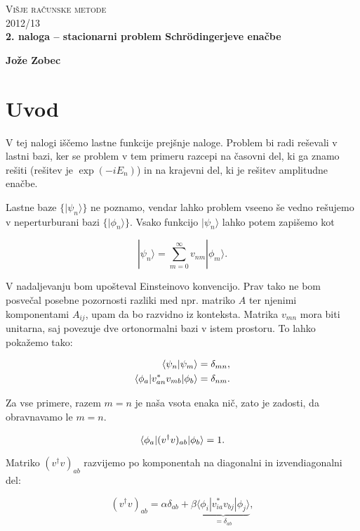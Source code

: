 \documentclass[a4 paper, 12pt]{article}
\begin{document}
\begin{center}
\textsc{Višje računske metode}\\
\textsc{2012/13}\\[0.5cm]
\textbf{2. naloga -- stacionarni problem Schr\" odingerjeve enačbe}
\end{center}
\begin{flushright}
\textbf{Jože Zobec}
\end{flushright}

\section{Uvod}

V tej nalogi iščemo lastne funkcije prejšnje naloge. Problem bi radi reševali v lastni bazi,
ker se problem v tem primeru razcepi na časovni del, ki ga znamo rešiti (rešitev je
$\exp(-iE_n)$) in na krajevni del, ki je rešitev amplitudne enačbe.

Lastne baze $\big\{|\psi_n\rangle\big\}$ ne poznamo, vendar lahko problem vseeno še vedno
rešujemo v neperturburani bazi $\big\{|\phi_n\rangle\big\}$. Vsako funkcijo $|\psi_n\rangle$
lahko potem zapišemo kot

\[
	|\psi_n\rangle = \sum_{m=0}^\infty v_{nm}|\phi_m\rangle.
\]

V nadaljevanju bom upošteval Einsteinovo konvencijo. Prav tako ne bom posvečal posebne
pozornosti razliki med npr. matriko $A$ ter njenimi komponentami $A_{ij}$, upam da bo razvidno
iz konteksta. Matrika $v_{mn}$ mora biti unitarna, saj povezuje dve ortonormalni bazi v istem prostoru.
To lahko pokažemo tako:

\begin{align}
	\langle\psi_n|\psi_m\rangle &= \delta_{mn}, \notag \\
	\langle\phi_a| v^*_{an} v_{mb} |\phi_b\rangle &= \delta_{nm}. \label{norm}
\end{align}

Za vse primere, razem $m = n$ je naša vsota enaka nič, zato je zadosti, da obravnavamo le 
$m = n$.

\begin{equation}
	\langle\phi_a| (v^\dagger v)_{ab} |\phi_b\rangle = 1. \\
	\label{stuff}
\end{equation}

Matriko $(v^\dagger v)_{ab}$ razvijemo po komponentah na diagonalni in izvendiagonalni del:

\begin{equation*}
	(v^\dagger v)_{ab} = \alpha\delta_{ab} +
		\beta\underbrace{\langle\phi_i| v^*_{ia}v_{bj} |\phi_j\rangle}_{=\delta_{ab}},
\end{equation*}
\end{document}
